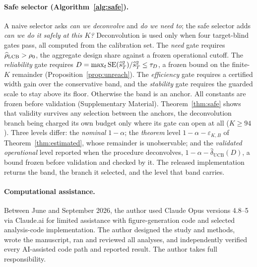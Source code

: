 \paragraph{Safe selector (Algorithm~\ref{alg:safe}).} A naive selector asks
\emph{can we deconvolve} and \emph{do we need to}; the safe selector adds
\emph{can we do it safely at this $K$?} Deconvolution is used only
when four target-blind gates pass, all computed from the calibration set.
The \emph{need} gate requires $\widehat{\rho}_{\text{LCB}}>\rho_0$, the aggregate
design share against a frozen operational cutoff. The \emph{reliability}
gate requires $D=\max_t\operatorname{SE}(\widehat s_T^2)/\widehat s_T^2\le\tau_D$, a
frozen bound on the finite-$K$ remainder (Proposition~\ref{prop:unreach}).
The \emph{efficiency} gate requires a certified width gain over the
conservative band, and the \emph{stability} gate requires the guarded scale
to stay above its floor. Otherwise the band is an anchor. All constants are
frozen before validation (Supplementary Material). Theorem~\ref{thm:safe}
shows that validity survives any selection between the anchors, the
deconvolution branch being charged its own budget only where its gate can
open at all ($K\ge94$). Three levels differ: the \emph{nominal}
$1-\alpha$; the \emph{theorem} level $1-\alpha-\varepsilon_{K,B}$ of
Theorem~\ref{thm:estimated}, whose remainder is unobservable; and the
\emph{validated operational} level reported when the procedure deconvolves,
$1-\alpha-\widehat\delta_{\text{UCB}}(D)$, a bound frozen before validation
and checked by it. The released implementation returns the band, the branch
it selected, and the level that band carries.
\paragraph{Computational assistance.} Between June and September 2026, the
author used Claude Opus versions 4.8--5 via Claude.ai for limited assistance
with figure-generation code and selected analysis-code implementation. The
author designed the study and methods, wrote the manuscript, ran and reviewed
all analyses, and independently verified every AI-assisted code path and
reported result. The author takes full responsibility.

